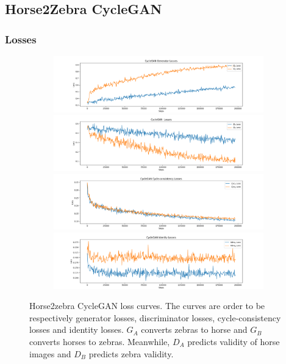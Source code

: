 \documentclass[12pt, fleqn, titlepage]{article}
\newcommand{\1}[1]{\mathds{1}\left[#1\right]}
\begin{document}
\subsection{Horse2Zebra CycleGAN}\label{horse2zebra_cyclegan}


\subsubsection{Losses}
\begin{figure}[H]
	\centering
	\begin{subfigure}[b]{0.8\textwidth}
		\centering
		\includegraphics[width=\linewidth]{imgs/horse2zebra_generator_losses}
		\label{fig:horse2zebra_generator_loss}
		\hfill
		\includegraphics[width=\linewidth]{imgs/horse2zebra_discriminator_losses}
		\label{fig:horse2zebra_discriminator_loss}
		\hfill
		\includegraphics[width=\linewidth]{imgs/horse2zebra_cycle_losses}
		\label{fig:horse2zebra_cycle_loss}
		\hfill
		\includegraphics[width=\linewidth]{imgs/horse2zebra_identity_losses}
		\label{fig:horse2zebra_identity_loss}
	\end{subfigure}
	\caption{Horse2zebra CycleGAN loss curves. The curves are order to be respectively generator losses, discriminator losses, cycle-consistency losses and identity losses. $G_A$ converts zebras to horse and $G_B$ converts horses to zebras. Meanwhile, $D_A$ predicts validity of horse images and $D_B$ predicts zebra validity.}
	\label{fig:horse2zebra_losses}
\end{figure}
\end{document}

